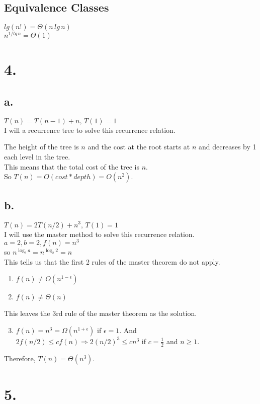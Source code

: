 \documentclass[12pt]{article}
\begin{document}
\subsection*{Equivalence Classes}
$lg(n!) = \Theta(n\,lg\,n)$\\
$n^{1/lg\,n} = \Theta(1)$

\section*{4.}
\subsection*{a.} $T(n) = T(n-1)+n,\,T(1) = 1$\\
I will a recurrence tree to solve this recurrence relation.\\
\begin{center}
\end{center}
The height of the tree is $n$ and the cost at the root starts at $n$ and decreases by 1 each level in the tree.\\
This means that the total cost of the tree is $n$.\\
So $T(n) = O(cost*depth) = O(n^2)$.
\subsection*{b.} $T(n) = 2T(n/2)+n^3,\,T(1) = 1$\\
I will use the master method to solve this recurrence relation.\\
$a=2, b=2, f(n)=n^3$\\
so $n^{\log_{b} a} = n^{\log_{2} 2} = n$\\
This tells us that the first 2 rules of the master theorem do not apply.
\begin{enumerate}
\item $f(n) \ne O(n^{1-\epsilon})$
\item $f(n) \ne \Theta{(n)}$
\end{enumerate}
This leaves the 3rd rule of the master theorem as the solution.\\
\begin{enumerate}
\setcounter{enumi}{2}
\item $f(n) = n^3 = \Omega{(n^{1+\epsilon})}$ if $\epsilon = 1$.  And $2f(n/2) \le cf(n) \Rightarrow 2(n/2)^3 \le cn^3$ if $c=\frac{1}{2}$ and $n \ge 1$.
\end{enumerate}
Therefore, $T(n) = \Theta{(n^3)}$.

\section*{5.}
\end{document}
